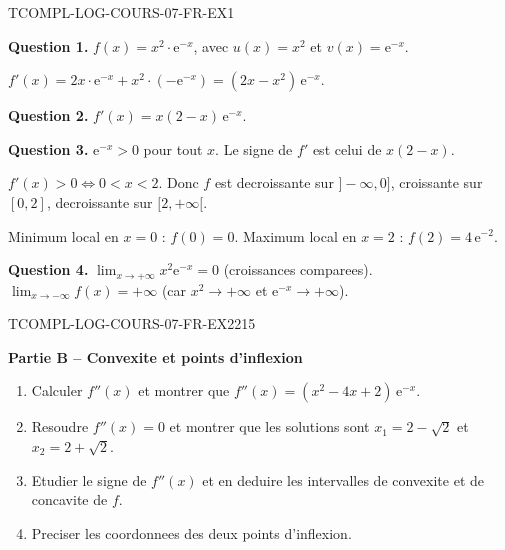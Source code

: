 \begin{corrige}{TCOMPL-LOG-COURS-07-FR-EX1}

\textbf{Question 1.} $f(x) = x^2 \cdot \mathrm{e}^{-x}$, avec $u(x) = x^2$ et $v(x) = \mathrm{e}^{-x}$.

$f'(x) = 2x \cdot \mathrm{e}^{-x} + x^2 \cdot (-\mathrm{e}^{-x}) = (2x - x^2)\,\mathrm{e}^{-x}$.

\textbf{Question 2.} $f'(x) = x(2-x)\,\mathrm{e}^{-x}$.

\textbf{Question 3.} $\mathrm{e}^{-x} > 0$ pour tout $x$. Le signe de $f'$ est celui de $x(2-x)$.

$f'(x) > 0 \iff 0 < x < 2$. Donc $f$ est decroissante sur $]-\infty, 0]$, croissante sur $[0, 2]$, decroissante sur $[2, +\infty[$.

Minimum local en $x = 0$ : $f(0) = 0$. Maximum local en $x = 2$ : $f(2) = 4\,\mathrm{e}^{-2}$.

\textbf{Question 4.} $\lim_{x \to +\infty} x^2 \mathrm{e}^{-x} = 0$ (croissances comparees). $\lim_{x \to -\infty} f(x) = +\infty$ (car $x^2 \to +\infty$ et $\mathrm{e}^{-x} \to +\infty$).

\end{corrige}

\bigskip


\begin{exercice}{TCOMPL-LOG-COURS-07-FR-EX2}{2}{15}

\textbf{Partie B -- Convexite et points d'inflexion}

\begin{enumerate}
  \item Calculer $f''(x)$ et montrer que $f''(x) = (x^2 - 4x + 2)\,\mathrm{e}^{-x}$.
  \item Resoudre $f''(x) = 0$ et montrer que les solutions sont $x_1 = 2 - \sqrt{2}$ et $x_2 = 2 + \sqrt{2}$.
  \item Etudier le signe de $f''(x)$ et en deduire les intervalles de convexite et de concavite de $f$.
  \item Preciser les coordonnees des deux points d'inflexion.
\end{enumerate}

\end{exercice}

